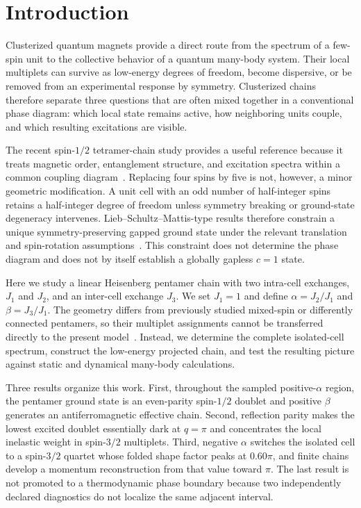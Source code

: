\section{Introduction}
\label{sec:introduction}

Clusterized quantum magnets provide a direct route from the spectrum of a few-spin unit to the collective behavior of a quantum many-body system.
Their local multiplets can survive as low-energy degrees of freedom, become dispersive, or be removed from an experimental response by symmetry.
Clusterized chains therefore separate three questions that are often mixed together in a conventional phase diagram: which local state remains active, how neighboring units couple, and which resulting excitations are visible.

The recent spin-$1/2$ tetramer-chain study provides a useful reference because it treats magnetic order, entanglement structure, and excitation spectra within a common coupling diagram~\cite{li2026tetramer_verified}.
Replacing four spins by five is not, however, a minor geometric modification.
A unit cell with an odd number of half-integer spins retains a half-integer degree of freedom unless symmetry breaking or ground-state degeneracy intervenes.
Lieb--Schultz--Mattis-type results therefore constrain a unique symmetry-preserving gapped ground state under the relevant translation and spin-rotation assumptions~\cite{lieb1961,ogata2019}.
This constraint does not determine the phase diagram and does not by itself establish a globally gapless $c=1$ state.

Here we study a linear Heisenberg pentamer chain with two intra-cell exchanges, $J_1$ and $J_2$, and an inter-cell exchange $J_3$.
We set $J_1=1$ and define $\alpha=J_2/J_1$ and $\beta=J_3/J_1$.
The geometry differs from previously studied mixed-spin or differently connected pentamers, so their multiplet assignments cannot be transferred directly to the present model~\cite{haraldsen2011}.
Instead, we determine the complete isolated-cell spectrum, construct the low-energy projected chain, and test the resulting picture against static and dynamical many-body calculations.

Three results organize this work.
First, throughout the sampled positive-$\alpha$ region, the pentamer ground state is an even-parity spin-$1/2$ doublet and positive $\beta$ generates an antiferromagnetic effective chain.
Second, reflection parity makes the lowest excited doublet essentially dark at $q=\pi$ and concentrates the local inelastic weight in spin-$3/2$ multiplets.
Third, negative $\alpha$ switches the isolated cell to a spin-$3/2$ quartet whose folded shape factor peaks at $0.60\pi$, and finite chains develop a momentum reconstruction from that value toward $\pi$.
The last result is not promoted to a thermodynamic phase boundary because two independently declared diagnostics do not localize the same adjacent interval.


